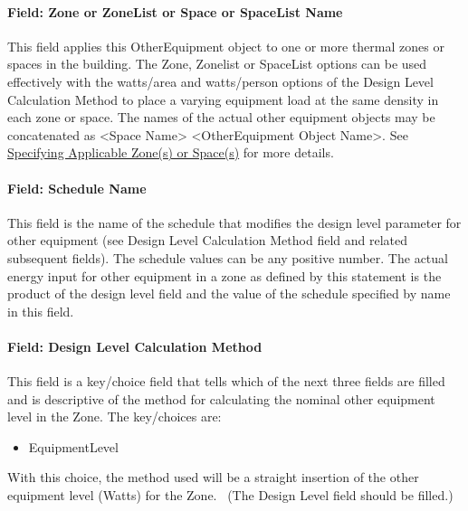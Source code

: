 \paragraph{Field: Zone or ZoneList or Space or SpaceList Name}\label{othereq-field-zone-or-zonelist-name-000}

This field applies this OtherEquipment object to one or more thermal zones or spaces in the building. The Zone, Zonelist or SpaceList options can be used effectively with the watts/area and watts/person options of the Design Level Calculation Method to place a varying equipment load at the same density in each zone or space. The names of the actual other equipment objects may be concatenated as \textless{}Space Name\textgreater{} \textless{}OtherEquipment Object Name\textgreater{}. See \hyperref[specifying-applicable-zones-or-spaces]{Specifying Applicable Zone(s) or Space(s)} for more details.

\paragraph{Field: Schedule Name}\label{field-schedule-name-5-000}

This field is the name of the schedule that modifies the design level parameter for other equipment (see Design Level Calculation Method field and related subsequent fields). The schedule values can be any positive number. The actual energy input for other equipment in a zone as defined by this statement is the product of the design level field and the value of the schedule specified by name in this field.

\paragraph{Field: Design Level Calculation Method}\label{field-design-level-calculation-method-5}

This field is a key/choice field that tells which of the next three fields are filled and is descriptive of the method for calculating the nominal other equipment level in the Zone. The key/choices are:

\begin{itemize}
\tightlist
\item
  EquipmentLevel
\end{itemize}

With this choice, the method used will be a straight insertion of the other equipment level (Watts) for the Zone.~ (The Design Level field should be filled.)

